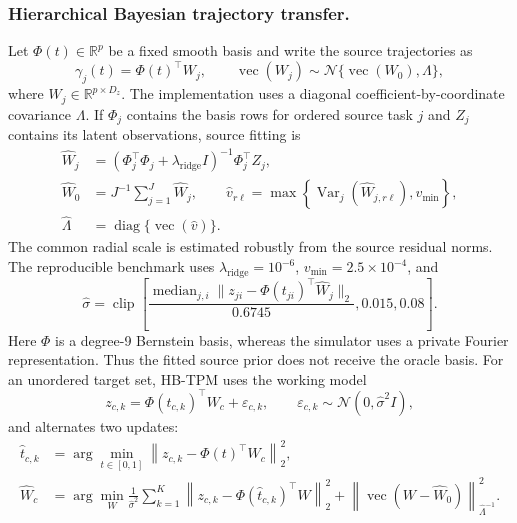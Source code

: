\documentclass[preprint,12pt,number]{elsarticle}
\begin{document}
\subsubsection{Hierarchical Bayesian trajectory transfer.}
Let $\Phi(t)\in\mathbb{R}^{p}$ be a fixed smooth basis and write the source trajectories as
\begin{equation}
	\gamma_j(t)=\Phi(t)^\top W_j,
	\qquad
	\operatorname{vec}(W_j)
	\sim
	\mathcal{N}\{\operatorname{vec}(W_0),\Lambda\},
	\label{eq:hb_tpm_source}
\end{equation}
where $W_j\in\mathbb{R}^{p\times D_z}$. The implementation uses a diagonal coefficient-by-coordinate covariance $\Lambda$. If $\Phi_j$ contains the basis rows for ordered source task $j$ and $Z_j$ contains its latent observations, source fitting is
\begin{align}
	\widehat W_j
	&=(\Phi_j^\top\Phi_j+\lambda_{\mathrm{ridge}}I)^{-1}\Phi_j^\top Z_j,\nonumber\\
	\widehat W_0
	&=J^{-1}\sum_{j=1}^{J}\widehat W_j,\qquad
	\widehat v_{r\ell}
	=\max\!\left\{\operatorname{Var}_j(\widehat W_{j,r\ell}),v_{\min}\right\},\nonumber\\
	\widehat\Lambda
	&=\operatorname{diag}\{\operatorname{vec}(\widehat v)\}.
	\label{eq:hb_tpm_prior_fit}
\end{align}
The common radial scale is estimated robustly from the source residual norms. The reproducible benchmark uses $\lambda_{\mathrm{ridge}}=10^{-6}$, $v_{\min}=2.5\times10^{-4}$, and
\[
	\widehat\sigma
	=
	\operatorname{clip}\!\left[
	\frac{\operatorname{median}_{j,i}
	\lVert z_{ji}-\Phi(t_{ji})^\top\widehat W_j\rVert_2}{0.6745},
	0.015,0.08
	\right].
\]
Here $\Phi$ is a degree-9 Bernstein basis, whereas the simulator uses a private Fourier representation. Thus the fitted source prior does not receive the oracle basis. For an unordered target set, HB-TPM uses the working model
\[
	z_{c,k}=\Phi(t_{c,k})^\top W_c+\varepsilon_{c,k},
	\qquad
	\varepsilon_{c,k}\sim\mathcal{N}(0,\widehat\sigma^2 I),
\]
and alternates two updates:
\begin{align}
	\widehat t_{c,k}
	&=\arg\min_{t\in[0,1]}
	\left\lVert z_{c,k}-\Phi(t)^\top W_c\right\rVert_2^2,
	\label{eq:hb_tpm_index}\\
	\widehat W_c
	&=\arg\min_W
	\frac{1}{\widehat\sigma^2}\sum_{k=1}^{K}
	\left\lVert z_{c,k}-\Phi(\widehat t_{c,k})^\top W\right\rVert_2^2
	+\left\lVert\operatorname{vec}(W-\widehat W_0)\right\rVert_{\widehat\Lambda^{-1}}^2.
	\label{eq:hb_tpm_map}
\end{align}
\end{document}
